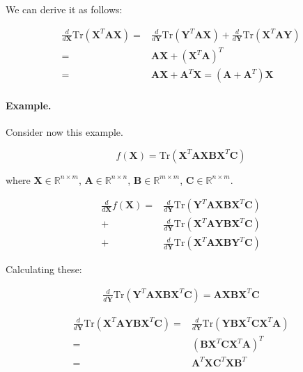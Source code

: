 \documentclass{article}
\begin{document}
\begin{appendices}
We can derive it as follows:

\[
\begin{split}
    \frac{d}{d\mathbf{X}} \text{Tr}(\mathbf{X}^T \mathbf{A} \mathbf{X}) =& \frac{d}{d\mathbf{Y}} \text{Tr}(\mathbf{Y}^T \mathbf{A} \mathbf{X}) + \frac{d}{d\mathbf{Y}} \text{Tr}(\mathbf{X}^T \mathbf{A} \mathbf{Y})\\
    =& \mathbf{A} \mathbf{X} + (\mathbf{X}^T \mathbf{A})^T\\
    =& \mathbf{A} \mathbf{X} + \mathbf{A}^T \mathbf{X} = (\mathbf{A} + \mathbf{A}^T) \mathbf{X}
\end{split}
\]

\paragraph{Example.} Consider now this example.

\[
f(\mathbf{X}) = \text{Tr}(\mathbf{X}^T \mathbf{A} \mathbf{X} \mathbf{B} \mathbf{X}^T \mathbf{C})
\]

where $\mathbf{X} \in \mathbb{R}^{n\times m}$, $\mathbf{A} \in \mathbb{R}^{n\times n}$, $\mathbf{B} \in \mathbb{R}^{m\times m}$, $\mathbf{C} \in \mathbb{R}^{n\times m}$.

\[
\begin{split}
    \frac{d}{d\mathbf{X}} f(\mathbf{X}) =& \frac{d}{d\mathbf{Y}} \text{Tr}(\mathbf{Y}^T \mathbf{A} \mathbf{X} \mathbf{B} \mathbf{X}^T \mathbf{C})\\
    +& \frac{d}{d\mathbf{Y}} \text{Tr}(\mathbf{X}^T \mathbf{A} \mathbf{Y} \mathbf{B} \mathbf{X}^T \mathbf{C})\\
    +& \frac{d}{d\mathbf{Y}} \text{Tr}(\mathbf{X}^T \mathbf{A} \mathbf{X} \mathbf{B} \mathbf{Y}^T \mathbf{C})
\end{split}
\]

Calculating these:

\[
\begin{split}
    \frac{d}{d\mathbf{Y}} \text{Tr}(\mathbf{Y}^T \mathbf{A} \mathbf{X} \mathbf{B} \mathbf{X}^T \mathbf{C}) = \mathbf{A} \mathbf{X} \mathbf{B} \mathbf{X}^T \mathbf{C}
\end{split}
\]

\[
\begin{split}
    \frac{d}{d\mathbf{Y}} \text{Tr}(\mathbf{X}^T \mathbf{A} \mathbf{Y} \mathbf{B} \mathbf{X}^T \mathbf{C}) =& \frac{d}{d\mathbf{Y}} \text{Tr}(\mathbf{Y} \mathbf{B} \mathbf{X}^T \mathbf{C} \mathbf{X}^T \mathbf{A})\\
    =& (\mathbf{B} \mathbf{X}^T \mathbf{C} \mathbf{X}^T \mathbf{A})^T\\
    =& \mathbf{A}^T \mathbf{X} \mathbf{C}^T \mathbf{X} \mathbf{B}^T
\end{split}
\]


\end{appendices}
\end{document}
